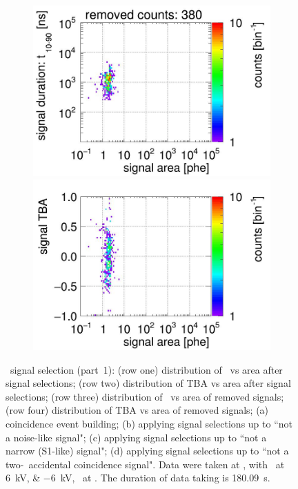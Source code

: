 \begin{landscape}
\begin{figure}[!p]
\begin{subfigure}[t]{0.33\textwidth}
	\includegraphics[width=\figurewidth,clip,trim={0 98 0 10}]{Figures/GasTest/CutsValid/res64767/pdpaX06Vecfig64767.jpg}
	\includegraphics[width=\figurewidth,clip,trim={0 0 0 40}]{Figures/GasTest/CutsValid/res64767/tbapaX06Vecfig64767.jpg}
	\caption{}
	\label{fig:signal selection 06}
\end{subfigure}
	\caption[\gtest\ signal selection (part~1).]{\gtest\ signal selection (part~1): 
			(row one) distribution of \rpdshort\ vs area after signal selections;
(row two) distribution of TBA vs area after signal selections;
(row three) distribution of \rpdshort\ vs area of removed signals;
(row four) distribution of TBA vs area of removed signals;
		(a) coincidence event building; 
		(b) applying signal selections up to ``not a noise-like signal";
		(c) applying signal selections up to ``not a narrow (S1-like) signal";
		(d) applying signal selections up to ``not a two-\sphe\ accidental coincidence signal".
		Data were taken at , with \opvtvb\ at \SIlist{+6;-6}{kV}, \opgd\ at \standarddensity . The duration of data taking is \SI{180.09}{\s}.
     }
	\label{fig:signal selection l1}
\end{figure}
\end{landscape}
